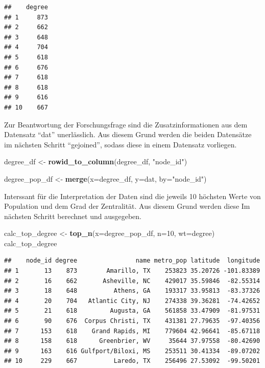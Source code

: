 \documentclass[]{article}
\newenvironment{Shaded}{\begin{snugshade}}{\end{snugshade}}
\newcommand{\DataTypeTok}[1]{\textcolor[rgb]{0.13,0.29,0.53}{#1}}
\newcommand{\DecValTok}[1]{\textcolor[rgb]{0.00,0.00,0.81}{#1}}
\newcommand{\KeywordTok}[1]{\textcolor[rgb]{0.13,0.29,0.53}{\textbf{#1}}}
\newcommand{\NormalTok}[1]{#1}
\newcommand{\StringTok}[1]{\textcolor[rgb]{0.31,0.60,0.02}{#1}}
\begin{document}
\begin{verbatim}
##    degree
## 1     873
## 2     662
## 3     648
## 4     704
## 5     618
## 6     676
## 7     618
## 8     618
## 9     616
## 10    667
\end{verbatim}

Zur Beantwortung der Forschungsfrage sind die Zusatzinformationen aus
dem Datensatz ``dat'' unerlässlich. Aus diesem Grund werden die beiden
Datensätze im nächsten Schritt ``gejoined'', sodass diese in einem
Datensatz vorliegen.

\begin{Shaded}
\begin{Highlighting}[]
\NormalTok{degree_df <-}\StringTok{ }\KeywordTok{rowid_to_column}\NormalTok{(degree_df, }\StringTok{"node_id"}\NormalTok{)}

\NormalTok{degree_pop_df <-}\StringTok{ }\KeywordTok{merge}\NormalTok{(}\DataTypeTok{x=}\NormalTok{degree_df, }\DataTypeTok{y=}\NormalTok{dat, }\DataTypeTok{by=}\StringTok{"node_id"}\NormalTok{)}
\end{Highlighting}
\end{Shaded}

Interssant für die Interpretation der Daten sind die jeweils 10 höchsten
Werte von Population und dem Grad der Zentralität. Aus diesem Grund
werden diese Im nächsten Schritt berechnet und ausgegeben.

\begin{Shaded}
\begin{Highlighting}[]
\NormalTok{calc_top_degree <-}\StringTok{ }\KeywordTok{top_n}\NormalTok{(}\DataTypeTok{x=}\NormalTok{degree_pop_df, }\DataTypeTok{n=}\DecValTok{10}\NormalTok{, }\DataTypeTok{wt=}\NormalTok{degree)}
\NormalTok{calc_top_degree}
\end{Highlighting}
\end{Shaded}

\begin{verbatim}
##    node_id degree                name metro_pop latitude  longitude
## 1       13    873        Amarillo, TX    253823 35.20726 -101.83389
## 2       16    662       Asheville, NC    429017 35.59846  -82.55314
## 3       18    648          Athens, GA    193317 33.95813  -83.37326
## 4       20    704   Atlantic City, NJ    274338 39.36281  -74.42652
## 5       21    618         Augusta, GA    561858 33.47909  -81.97531
## 6       90    676  Corpus Christi, TX    431381 27.79635  -97.40356
## 7      153    618    Grand Rapids, MI    779604 42.96641  -85.67118
## 8      158    618      Greenbrier, WV     35644 37.97558  -80.42690
## 9      163    616 Gulfport/Biloxi, MS    253511 30.41334  -89.07202
## 10     229    667          Laredo, TX    256496 27.53092  -99.50201
\end{verbatim}
\end{document}
